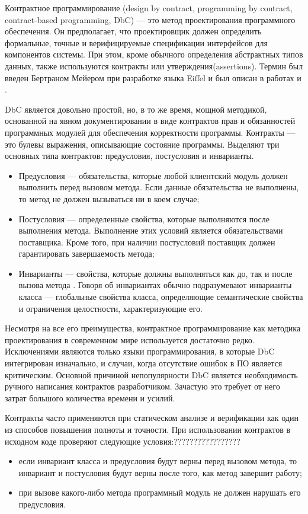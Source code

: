 Контрактное программирование (design by contract, programming by contract, contract-based programming, DbC) --- это метод проектирования программного обеспечения. Он предполагает, что проектировщик должен определить формальные, точные и верифицируемые спецификации интерфейсов для компонентов системы. При этом, кроме обычного определения абстрактных типов данных, также используются контракты или утверждения(assertions). Термин был введен Бертраном Мейером при разработке языка Eiffel\cite{eiffel} и был описан в работах \cite{designByContract} и \cite{oosc-meyer}.

DbC является довольно простой, но, в то же время, мощной методикой, основанной на явном документировании в виде контрактов прав и обязанностей программных модулей для обеспечения корректности программы. Контракты --- это булевы выражения, описывающие состояние программы. Выделяют три основных типа контрактов: предусловия, постусловия и инварианты.
\begin{itemize}
\item Предусловия --- обязательства, которые любой клиентский модуль должен выполнить перед вызовом метода. Если данные обязательства не выполнены, то метод не должен вызываться ни в коем случае;

\item Постусловия --- определенные свойства, которые выполняются после выполнения метода. Выполнение этих условий является обязательствами поставщика. Кроме того, при наличии постусловий поставщик должен гарантировать завершаемость метода;

\item Инварианты --- свойства, которые должны выполняться как до, так и после вызова метода . Говоря об инвариантах обычно подразумевают инварианты класса --- глобальные свойства класса, определяющие семантические свойства и ограничения целостности, характеризующие его.
\end{itemize}

Несмотря на все его преимущества, контрактное программирование как методика проектирования в современном мире используется достаточно редко. Исключениями являются только языки программирования, в которые DbC интегрирован изначально, и случаи, когда отсутствие ошибок в ПО является критическим. Основной причиной непопулярности DbC является необходимость ручного написания контрактов разработчиком. Зачастую это требует от него затрат большого количества времени и усилий. 

Контракты часто применяются при статическом анализе и верификации как один из способов повышения полноты и точности. При использовании контрактов в исходном коде проверяют следующие условия:?????????????????
\begin{itemize}
\item если инвариант класса и предусловия будут верны перед вызовом метода, то инвариант и постусловия будут верны после того, как метод завершит работу;

\item при вызове какого-либо метода программный модуль не должен нарушать его предусловия.
\end{itemize}

